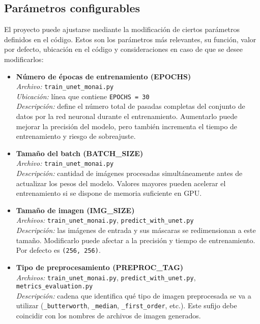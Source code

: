 \documentclass[12pt]{article}
\begin{document}
\subsection{Parámetros configurables}

El proyecto puede ajustarse mediante la modificación de ciertos parámetros definidos en el código. Estos son los parámetros más relevantes, su función, valor por defecto, ubicación en el código y consideraciones en caso de que se desee modificarlos:

\begin{itemize}
    \item \textbf{Número de épocas de entrenamiento (EPOCHS)}\\
    \textit{Archivo:} \texttt{train\_unet\_monai.py} \\
    \textit{Ubicación:} línea que contiene \texttt{EPOCHS = 30} \\
    \textit{Descripción:} define el número total de pasadas completas del conjunto de datos por la red neuronal durante el entrenamiento. Aumentarlo puede mejorar la precisión del modelo, pero también incrementa el tiempo de entrenamiento y riesgo de sobreajuste.

    \item \textbf{Tamaño del batch (BATCH\_SIZE)}\\
    \textit{Archivo:} \texttt{train\_unet\_monai.py} \\
    \textit{Descripción:} cantidad de imágenes procesadas simultáneamente antes de actualizar los pesos del modelo. Valores mayores pueden acelerar el entrenamiento si se dispone de memoria suficiente en GPU.

    \item \textbf{Tamaño de imagen (IMG\_SIZE)}\\
    \textit{Archivos:} \texttt{train\_unet\_monai.py}, \texttt{predict\_with\_unet.py} \\
    \textit{Descripción:} las imágenes de entrada y sus máscaras se redimensionan a este tamaño. Modificarlo puede afectar a la precisión y tiempo de entrenamiento. Por defecto es \texttt{(256, 256)}.

    \item \textbf{Tipo de preprocesamiento (PREPROC\_TAG)}\\
    \textit{Archivos:} \texttt{train\_unet\_monai.py}, \texttt{predict\_with\_unet.py}, \texttt{metrics\_evaluation.py} \\
    \textit{Descripción:} cadena que identifica qué tipo de imagen preprocesada se va a utilizar (\texttt{\_butterworth}, \texttt{\_median}, \texttt{\_first\_order}, etc.). Este sufijo debe coincidir con los nombres de archivos de imagen generados.


\end{itemize}
\end{document}
